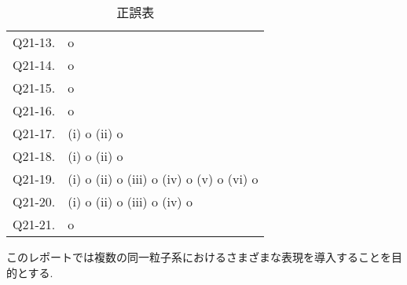 \documentclass[uplatex,dvipdfmx,a4paper,11pt]{jlreq}
\numberwithin{equation}{section}
\theoremstyle{definition}
\begin{document}
\begin{table}[hbtp]
\begin{tabular}{ll}
    Q21-13. & o                                                                                                                     \\
    Q21-14. & o                                                                                                                     \\
    Q21-15. & o                                                                                                                     \\
    Q21-16. & o                                                                                                                     \\
    Q21-17. & (i) o (ii) o                                                                                                          \\
    Q21-18. & (i) o (ii) o                                                                                                          \\
    Q21-19. & (i) o (ii) o (iii) o (iv) o (v) o (vi) o                                                                              \\
    Q21-20. & (i) o (ii) o (iii) o (iv) o                                                                                           \\
    Q21-21. & o                                                                                                                     \\
    \hline
  \end{tabular}
  \caption{正誤表}
\end{table}
\clearpage

このレポートでは複数の同一粒子系におけるさまざまな表現を導入することを目的とする.
\end{document}
